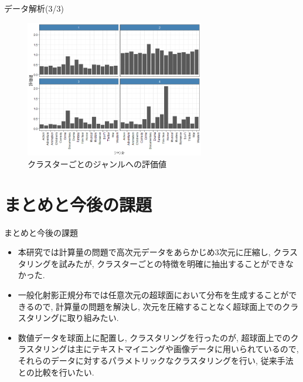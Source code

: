\documentclass[dvipdfmx]{beamer} %
\begin{document}
\begin{frame}{データ解析(3/3)}
\begin{figure}[tbp]
\begin{center}
\includegraphics[clip,height= 60mm]{data/cluster_plot.png}
\end{center}
\caption{クラスターごとのジャンルへの評価値}
\label{clustergenre}
\end{figure}

\end{frame}
\section{まとめと今後の課題}
\begin{frame}{まとめと今後の課題}

\begin{itemize}

\item
本研究では計算量の問題で高次元データをあらかじめ$3$次元に圧縮し, クラスタリングを試みたが, クラスターごとの特徴を明確に抽出することができなかった. 

\item
一般化射影正規分布では任意次元の超球面において分布を生成することができるので, 計算量の問題を解決し, 次元を圧縮することなく超球面上でのクラスタリングに取り組みたい. 
\item
数値データを球面上に配置し, クラスタリングを行ったのが, 超球面上でのクラスタリングは主にテキストマイニングや画像データに用いられているので, それらのデータに対するパラメトリックなクラスタリングを行い, 従来手法との比較を行いたい. 

\end{itemize}

\end{frame}
\end{document}
